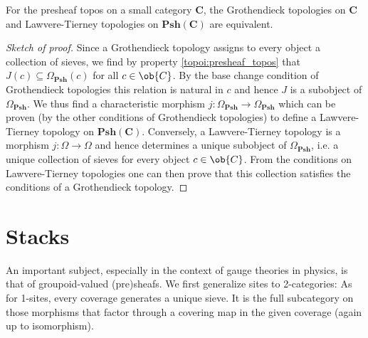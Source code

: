     \begin{property}
        For the presheaf topos on a small category $\mathbf{C}$, the Grothendieck topologies on $\mathbf{C}$ and Lawvere-Tierney topologies on $\mathbf{Psh}(\mathbf{C})$ are equivalent.
        \begin{proof}[Sketch of proof]
            Since a Grothendieck topology assigns to every object a collection of sieves, we find by property \ref{topoi:presheaf_topos} that $J(c)\subseteq\Omega_{\mathbf{Psh}}(c)$ for all $c\in\ob{C}$. By the base change condition of Grothendieck topologies this relation is natural in $c$ and hence $J$ is a subobject of $\Omega_{\mathbf{Psh}}$. We thus find a characteristic morphism $j:\Omega_{\mathbf{Psh}}\rightarrow\Omega_{\mathbf{Psh}}$ which can be proven (by the other conditions of Grothendieck topologies) to define a Lawvere-Tierney topology on $\mathbf{Psh}(\mathbf{C})$. Conversely, a Lawvere-Tierney topology is a morphism $j:\Omega\rightarrow\Omega$ and hence determines a unique subobject of $\Omega_{\mathbf{Psh}}$, i.e. a unique collection of sieves for every object $c\in\ob{C}$. From the conditions on Lawvere-Tierney topologies one can then prove that this collection satisfies the conditions of a Grothendieck topology.
        \end{proof}
    \end{property}

\section{Stacks}

    An important subject, especially in the context of gauge theories in physics, is that of groupoid-valued (pre)sheafs. We first generalize sites to 2-categories:
    As for 1-sites, every coverage generates a unique sieve. It is the full subcategory on those morphisms that factor through a covering map in the given coverage (again up to isomorphism).


